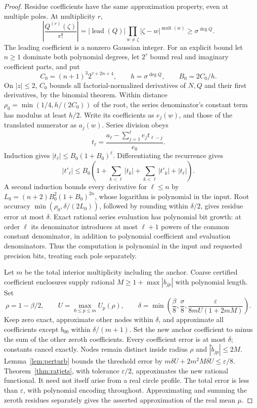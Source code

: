 \documentclass[11pt,a4paper]{article}
\theoremstyle{remark}\newtheorem{remark}[theorem]{Remark}
\begin{document}
\begin{proof}
Residue coefficients have the same approximation property, even
at multiple poles. At multiplicity \(r\),
\[
 \left|\frac{Q^{(r)}(\zeta)}{r!}\right|
 =|\operatorname{lead}(Q)|\prod_{w\ne\zeta}
 |\zeta-w|^{\operatorname{mult}(w)}\geq\sigma^{\deg Q}.
\]
The leading coefficient is a nonzero Gaussian integer. For an
explicit bound let \(n\geq1\) dominate both polynomial degrees,
let \(2^\tau\) bound real and imaginary coefficient parts, and put
\[
 C_0=(n+1)^3 2^{\tau+2n+4},\qquad
 h=\sigma^{\deg Q},\qquad B_0=2C_0/h.
\]
On \(|z|\leq2\), \(C_0\) bounds all factorial-normalized
derivatives of \(N,Q\) and their first derivatives, by the
binomial theorem. Within distance
\(\rho_0=\min(1/4,h/(2C_0))\) of the root, the series
denominator's constant term has modulus at least \(h/2\).
Write its coefficients as \(e_j(w)\), and those of the translated
numerator as \(a_j(w)\). Series division obeys
\[
 t_\ell=\frac{a_\ell-\sum_{j=1}^\ell e_jt_{\ell-j}}{e_0}.
\]
Induction gives \(|t_\ell|\leq B_0(1+B_0)^\ell\).
Differentiating the recurrence gives
\[
 |t'_\ell|\leq B_0\left(1+\sum_{k<\ell}|t_k|
                  +\sum_{k<\ell}|t'_k|+|t_\ell|\right).
\]
A second induction bounds every derivative for \(\ell\leq n\)
by \(L_0=(n+2)B_0^2(1+B_0)^{2n}\), whose logarithm is
polynomial in the input. Root accuracy
\(\min(\rho_0,\delta/(2L_0))\), followed by rounding within
\(\delta/2\), gives residue error at most \(\delta\).
Exact rational series evaluation has polynomial bit growth: at
order \(\ell\) its denominator introduces at most \(\ell+1\)
powers of the common constant denominator, in addition to
polynomial coefficient and evaluation denominators.
Thus the computation is polynomial in the input and requested
precision bits, treating each pole separately.

Let \(m\) be the total interior multiplicity including the anchor.
Coarse certified coefficient enclosures supply rational
\(M\geq1+\max|b_{jp}|\) with polynomial length. Set
\[
 \rho=1-\beta/2,\qquad U=\max_{0\leq p\leq m}U_p(\rho),\qquad
 \delta=\min\left(\frac\beta8,\frac\sigma8,
 \frac\varepsilon{8mU(1+2mM)}\right).
\]
Keep zero exact, approximate other nodes within \(\delta\), and
approximate all coefficients except \(b_{00}\) within
\(\delta/(m+1)\). Set the new anchor coefficient to minus the
sum of the other zeroth coefficients. Every coefficient error is
at most \(\delta\); constants cancel exactly. Nodes remain
distinct inside radius \(\rho\) and
\(|\widetilde b_{jp}|\leq2M\).
Lemma~\ref{lem:perturb} bounds the threshold error by
\(m\delta U+2m^2M\delta U\leq\varepsilon/8\).
Theorem~\ref{thm:ratjets}, with tolerance \(\varepsilon/2\),
approximates the new rational functional. It need not itself arise
from a real circle profile. The total error is less than
\(\varepsilon\), with polynomial encoding throughout.
Approximating and summing the zeroth residues separately gives
the asserted approximation of the real mean \(\mu\).


\end{proof}
\end{document}
